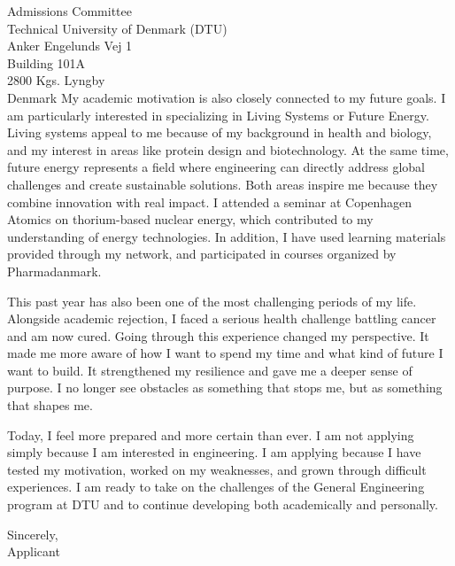 \documentclass[11pt,a4paper]{letter}
\begin{document}
\begin{letter}{Admissions Committee \\ Technical University of Denmark (DTU) \\ Anker Engelunds Vej 1 \\ Building 101A \\ 2800 Kgs. Lyngby \\ Denmark}
My academic motivation is also closely connected to my future goals. I am particularly interested in specializing in Living Systems or Future Energy. Living systems appeal to me because of my background in health and biology, and my interest in areas like protein design and biotechnology. At the same time, future energy represents a field where engineering can directly address global challenges and create sustainable solutions. Both areas inspire me because they combine innovation with real impact. I attended a seminar at Copenhagen Atomics on thorium-based nuclear energy, which contributed to my understanding of energy technologies. In addition, I have used learning materials provided through my network, and participated in courses organized by Pharmadanmark.

This past year has also been one of the most challenging periods of my life. Alongside academic rejection, I faced a serious health challenge battling cancer and am now cured. Going through this experience changed my perspective. It made me more aware of how I want to spend my time and what kind of future I want to build. It strengthened my resilience and gave me a deeper sense of purpose. I no longer see obstacles as something that stops me, but as something that shapes me.

Today, I feel more prepared and more certain than ever. I am not applying simply because I am interested in engineering. I am applying because I have tested my motivation, worked on my weaknesses, and grown through difficult experiences. I am ready to take on the challenges of the General Engineering program at DTU and to continue developing both academically and personally.
\closing{Sincerely, \\
Applicant}

\end{letter}
\end{document}
